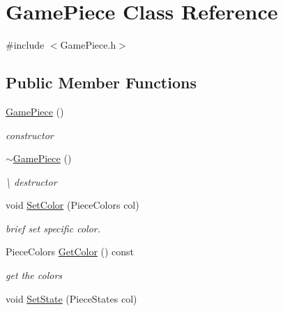 \hypertarget{class_game_piece}{\section{Game\-Piece Class Reference}
\label{class_game_piece}
}


{\ttfamily \#include $<$Game\-Piece.\-h$>$}

\subsection*{Public Member Functions}
\begin{DoxyCompactItemize}
\item 
\hypertarget{class_game_piece_a18c35027f419b8d779ee6774fa2f3519}{\hyperlink{class_game_piece_a18c35027f419b8d779ee6774fa2f3519}{Game\-Piece} ()}\label{class_game_piece_a18c35027f419b8d779ee6774fa2f3519}

\begin{DoxyCompactList}\small\item\em constructor \end{DoxyCompactList}\item 
\hypertarget{class_game_piece_af7c65a4a371226437eb6d6abfc876e1a}{\hyperlink{class_game_piece_af7c65a4a371226437eb6d6abfc876e1a}{$\sim$\-Game\-Piece} ()}\label{class_game_piece_af7c65a4a371226437eb6d6abfc876e1a}

\begin{DoxyCompactList}\small\item\em \textbackslash{} destructor \end{DoxyCompactList}\item 
\hypertarget{class_game_piece_a1788cc9c2a0129e233722f0b0a7385c8}{void \hyperlink{class_game_piece_a1788cc9c2a0129e233722f0b0a7385c8}{Set\-Color} (Piece\-Colors col)}\label{class_game_piece_a1788cc9c2a0129e233722f0b0a7385c8}

\begin{DoxyCompactList}\small\item\em brief set specific color. \end{DoxyCompactList}\item 
\hypertarget{class_game_piece_a26c9a06a967a0ba306d627dea5affd41}{Piece\-Colors \hyperlink{class_game_piece_a26c9a06a967a0ba306d627dea5affd41}{Get\-Color} () const }\label{class_game_piece_a26c9a06a967a0ba306d627dea5affd41}

\begin{DoxyCompactList}\small\item\em get the colors \end{DoxyCompactList}\item 
\hypertarget{class_game_piece_ad03a5826d6715d2a8de9aa0fcf811b69}{void \hyperlink{class_game_piece_ad03a5826d6715d2a8de9aa0fcf811b69}{Set\-State} (Piece\-States col)}\label{class_game_piece_ad03a5826d6715d2a8de9aa0fcf811b69}


\end{DoxyCompactItemize}
